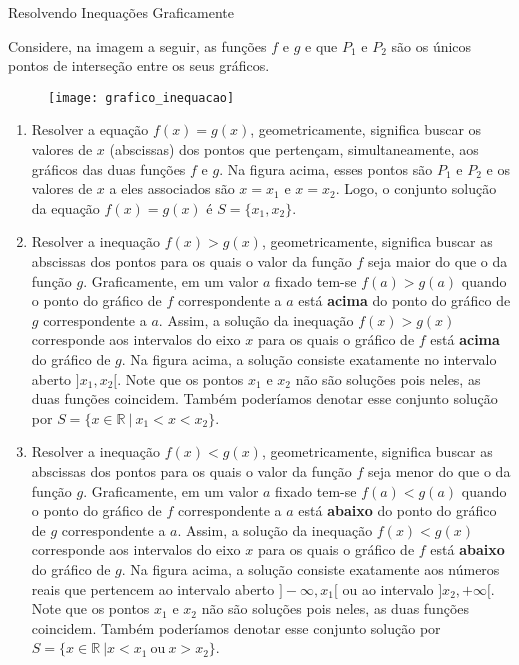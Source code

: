 \begin{observationtitle}{Resolvendo Inequações Graficamente}

Considere, na imagem a seguir, as funções $f$ e $g$ e que $P_1$ e $P_2$ são os únicos pontos de interseção entre os seus gráficos.

\begin{figure}[H]
\centering
\noindent\texttt{[image: grafico\_inequacao]}
\end{figure}


\begin{enumerate}
\item{}
	Resolver a equação $f(x) = g(x)$, geometricamente, significa buscar os valores de $x$ (abscissas) dos pontos que pertençam, simultaneamente, aos gráficos das duas funções $f$ e $g$. Na figura acima, esses pontos são $P_1$ e $P_2$ e os valores de $x$ a eles associados são $x = x_1$ e $x = x_2$. Logo, o conjunto solução da equação $f(x) = g(x)$ é $S =\{x_1, x_2\}$.

\item{}	
Resolver a inequação $f(x) > g(x)$, geometricamente, significa buscar as abscissas dos pontos para os quais o valor da função $f$ seja  maior do que o da função $g$. Graficamente, em um valor $a$ fixado tem-se $f(a)>g(a)$ quando o ponto do gráfico de $f$ correspondente a $a$ está \textbf{acima} do ponto do gráfico de $g$ correspondente a $a$. Assim, a solução da inequação $f(x)>g(x)$ corresponde aos intervalos do eixo $x$ para os quais o gráfico de $f$ está \textbf{acima} do gráfico de $g$. Na figura acima, a solução consiste exatamente no intervalo aberto $]x_1, x_2[$. Note que os pontos $x_1$ e $x_2$ não são soluções pois neles, as duas funções coincidem. Também poderíamos denotar esse conjunto solução por $S = \{x \in \mathbb{R}\ | \ x_1 < x < x_2\}$.

\item{}
Resolver a inequação $f(x) < g(x)$, geometricamente, significa buscar as abscissas dos pontos para os quais o valor da função $f$ seja menor do que o da função $g$. Graficamente, em um valor $a$ fixado tem-se $f(a)<g(a)$ quando o ponto do gráfico de $f$ correspondente a $a$ está \textbf{abaixo} do ponto do gráfico de $g$ correspondente a $a$. Assim, a solução da inequação $f(x)<g(x)$ corresponde aos intervalos do eixo $x$ para os quais o gráfico de $f$ está \textbf{abaixo} do gráfico de $g$. Na figura acima, a solução consiste exatamente aos números reais que pertencem ao intervalo aberto $]-\infty, x_1[$ ou ao intervalo $]x_2, +\infty[$. Note que os pontos $x_1$ e $x_2$ não são soluções pois neles, as duas funções coincidem. Também poderíamos denotar esse conjunto solução por $S = \{x \in \mathbb{R}\ | x < x_1 \ \mbox{ou} \ x > x_2\}$.


\end{enumerate}
\end{observationtitle}
